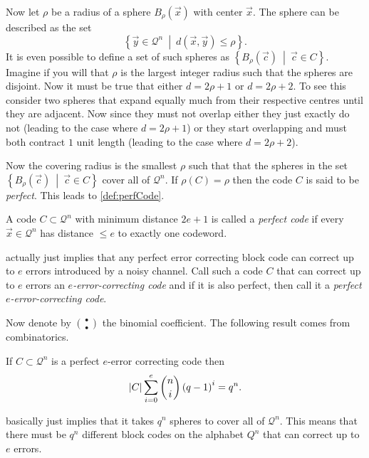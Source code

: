 Now let $\rho$ be a radius of a sphere $B_{\rho}\left(\vec{x}\right)$ with center $\vec{x}$. The sphere can be described as the set
\[	
	\left\{ \vec{y} \in \mathcal{Q}^n \ \middle\vert \ d\left(\vec{x},\vec{y}\right) \leq \rho \right\}.
\]
It is even possible to define a set of such spheres as $\left\{ B_{\rho} \left(\vec{c}\right) \ \middle\vert \ \vec{c} \in C \right\}$. Imagine if you will that $\rho$ is the largest integer radius such that the spheres are disjoint. Now it must be true that either $d = 2 \rho + 1$ or $d = 2 \rho + 2$. To see this consider two spheres that expand equally much from their respective centres until they are adjacent. Now since they must not overlap either they just exactly do not (leading to the case where $d = 2 \rho + 1$) or they start overlapping and must both contract $1$ unit length (leading to the case where $d = 2 \rho + 2$).

Now the covering radius is the smallest $\rho$ such that that the spheres in the set $\left\{ B_{\rho} \left(\vec{c}\right) \ \middle\vert \ \vec{c} \in C \right\}$ cover all of $\mathcal{Q}^n$. If $\rho \left(C\right) = \rho$ then the code $C$ is said to be \emph{perfect}. This leads to \cref{def:perfCode}.
\begin{defi}
\label{def:perfCode}
	A code $C \subset \mathcal{Q}^n$ with minimum distance $2e + 1$ is called a \emph{perfect code} if every $\vec{x} \in \mathcal{Q}^n$ has distance $\leq e$ to exactly one codeword.
\end{defi}
 actually just implies that any perfect error correcting block code can correct up to $e$ errors introduced by a noisy channel. Call such a code $C$ that can correct up to $e$ errors an \emph{$e$-error-correcting code} and if it is also perfect, then call it a \emph{perfect $e$-error-correcting code}.

 Now denote by $\binom{\bullet}{\bullet}$ the binomial coefficient. The following result comes from combinatorics.
\begin{cor}
\label{cor:spherePacking}
	If $C \subset \mathcal{Q}^n$ is a perfect $e$-error correcting code then
	\begin{equation*}
		\left\vert C \right\vert \sum_{i=0}^{e} \binom{n}{i} \left(q - 1\right)^i = q^n.
	\end{equation*}
\end{cor}
 basically just implies that it takes $q^n$ spheres to cover all of $\mathcal{Q}^n$. This means that there must be $q^n$ different block codes on the alphabet $Q^n$ that can correct up to $e$ errors.

